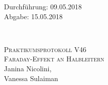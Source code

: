 



\begin{titlepage}
  \begin{flushleft}
 Durchführung: 09.05.2018\\
 Abgabe: 15.05.2018
  \end{flushleft}


\HRule\\[1,0cm]

 \begin{center}


\textsc{\LARGE Praktikumsprotokoll V46}\\[1.5cm]
\textsc{\huge Faraday-Effekt an Halbleitern} \\[5,5cm]

Janina Nicolini\footnotemark[1], \\
Vanessa Sulaiman\footnotemark[2] \\[1,0cm]



 \end{center}
\HRule

 \vfill

\end{titlepage}






\printbibliography


